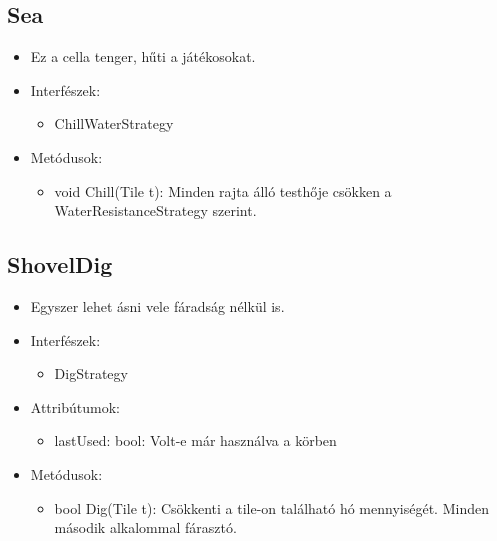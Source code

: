 \subsection{Sea}
\begin{itemize}
		\item Ez a cella tenger, hűti a játékosokat.
	\item Interfészek:
	\begin{itemize}
		\item ChillWaterStrategy
	\end{itemize}
	\item Metódusok:
	\begin{itemize}
		\item void Chill(Tile t): Minden rajta álló testhője csökken a WaterResistanceStrategy szerint.
	\end{itemize}
\end{itemize}

\subsection{ShovelDig}
\begin{itemize}
	\item Egyszer lehet ásni vele fáradság nélkül is.
	\item Interfészek:
	\begin{itemize}
		\item DigStrategy
	\end{itemize}
	\item Attribútumok:
	\begin{itemize}
		\item lastUsed: bool: Volt-e már használva a körben
	\end{itemize}
	\item Metódusok:
	\begin{itemize}
		\item bool Dig(Tile t): Csökkenti a tile-on található hó mennyiségét. Minden második alkalommal fárasztó.
	\end{itemize}
\end{itemize}

